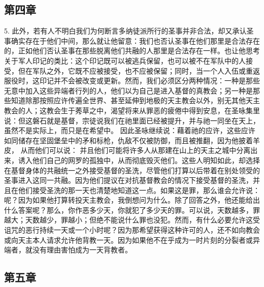 \subsection{第四章}

5. 此外，若有人不明白我们为何断言多纳徒派所行的圣事并非合法，却又承认圣事确实存在于他们中间，那么就让他留意：我们也否认圣事在他们那里是合法存在的，正如他们否认圣事在那些脱离他们共融的人那里是合法存在一样。也让他思考关于军人印记的类比：这个印记既可以被逃兵保留，也可以被不在军队中的人接受，但在军队之外，它既不应被接受，也不应被保留；同时，当一个人入伍或重返服役时，这印记并不会被改变或更新。然而，我们必须区分两种情况：一种是那些无意中加入这些异端者行列的人，他们以为自己是进入基督的真教会；另一种是那些知道除那按照应许传遍全世界、甚至延伸到地极的天主教会以外，别无其他天主教会的人；这教会生于莠草之中，渴望将来从罪恶的疲倦中得到安息，在圣咏集里说：但这磐石就是基督，宗徒说我们在祂里面已经被提升，并与祂一同坐在天上，虽然不是实际上，而只是在希望中。 因此圣咏继续说：藉着祂的应许，这些应许如同储存在坚固堡垒中的矛和标枪，仇敌不仅被防御，而且被推翻，因为他披着羊皮， 从而他们可以说： 并且他们可能将许多人从那建在山上的天主之城中分离出来，诱入他们自己的网罗的孤独中，从而彻底毁灭他们。这些人明知如此，却选择在基督身体的共融统一之外接受基督的圣洗，尽管他们打算以后带着在别处领受的圣事进入这同一共融。因为他们提议在对抗基督教会的情况下接受基督的圣洗，并且在他们接受圣洗的那一天也清楚地知道这一点。如果这是罪，那么谁会允许说：呢？因为如果他打算转投天主教会，我倒想问为什么。除了回答之外，他还能给出什么答案呢？那么，你作恶多少天，你就犯了多少天的罪。可以说，天数越多，罪越大；天数越少，罪越小；但绝不能说什么罪也没犯。然而，有什么必要允许这受诅咒的恶行持续一天或一个小时呢？因为那希望获得这种许可的人，还不如向教会或向天主本人请求允许他背教一天。因为如果他不在乎成为一时片刻的分裂者或异端者，就没有理由害怕成为一天背教者。\par


\subsection{第五章}

